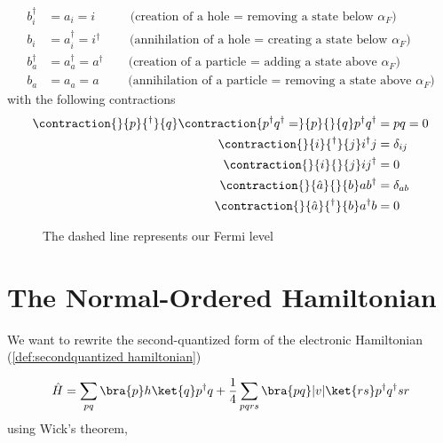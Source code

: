\begin{align}
 b_i^{\dagger} &= a_i           = i         \,\,\,\,\,\qquad \text{(creation of a hole = removing a state below $\alpha_F$)} \nonumber \\
 b_i           &= a_i^{\dagger} = i^\dagger \,\,\qquad \text{(annihilation of a hole = creating a state below $\alpha_F$)} \nonumber \\
 b_a^{\dagger} &= a_a^{\dagger} = a^\dagger \qquad \text{(creation of a particle = adding a state above $\alpha_F$) } \nonumber \\
 b_a           &= a_a           = a         \,\,\qquad \text{(annihilation of a particle = removing a state above $\alpha_F$)}
\label{def:simplyfied notation of quasi-operators}
\end{align}
%
with the following contractions
\begin{align}
\contraction{}{p}{{}^{\dagger}}{q}
\contraction{p^{\dagger}q^{\dagger} = }{p}{}{q}
p^{\dagger}q^{\dagger} &= pq = 0  \label{eq:contraction 1} \\
\contraction{}{i}{{}^{\dagger}}{j}
i^{\dagger}j &= \delta_{ij} \label{eq:contraction 2} \\
\contraction{}{i}{}{j}
ij^{\dagger} &= 0 \label{eq:contraction 3} \\
\contraction{}{\hat{a}}{}{b}
ab^{\dagger} &= \delta_{ab} \label{eq:contraction 4}\\
\contraction{}{\hat{a}}{{}^{\dagger}}{b}
a^{\dagger}b &= 0 \label{eq:contraction 5}
\end{align}


\begin{figure}
\centering
     \scalebox{0.7}{}
  \caption{The dashed line represents our Fermi level}
  \label{fig:particleholerepresentation}
\end{figure}

\section{The Normal-Ordered Hamiltonian}
We want to rewrite the second-quantized form of the electronic Hamiltonian (\ref{def:secondquantized hamiltonian}) 

\begin{equation}
\hat{H} = \sum_{pq} \bra{p}h\ket{q}p^{\dagger}q + \frac{1}{4}\sum_{pqrs} \bra{pq}|v|\ket{rs}p^{\dagger}q^{\dagger}sr 
 \label{def:normal-ordered hamiltonian}
\end{equation}
%
using Wick's theorem, 

